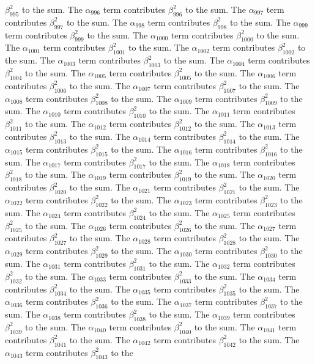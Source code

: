 \begin{lemma}
$\beta_{995}^{2}$ to the sum. The $\alpha_{996}$ term contributes $\beta_{996}^{2}$ to the sum. The $\alpha_{997}$ term contributes $\beta_{997}^{2}$ to the sum. The $\alpha_{998}$ term contributes $\beta_{998}^{2}$ to the sum. The $\alpha_{999}$ term contributes $\beta_{999}^{2}$ to the sum. The $\alpha_{1000}$ term contributes $\beta_{1000}^{2}$ to the sum. The $\alpha_{1001}$ term contributes $\beta_{1001}^{2}$ to the sum. The $\alpha_{1002}$ term contributes $\beta_{1002}^{2}$ to the sum. The $\alpha_{1003}$ term contributes $\beta_{1003}^{2}$ to the sum. The $\alpha_{1004}$ term contributes $\beta_{1004}^{2}$ to the sum. The $\alpha_{1005}$ term contributes $\beta_{1005}^{2}$ to the sum. The $\alpha_{1006}$ term contributes $\beta_{1006}^{2}$ to the sum. The $\alpha_{1007}$ term contributes $\beta_{1007}^{2}$ to the sum. The $\alpha_{1008}$ term contributes $\beta_{1008}^{2}$ to the sum. The $\alpha_{1009}$ term contributes $\beta_{1009}^{2}$ to the sum. The $\alpha_{1010}$ term contributes $\beta_{1010}^{2}$ to the sum. The $\alpha_{1011}$ term contributes $\beta_{1011}^{2}$ to the sum. The $\alpha_{1012}$ term contributes $\beta_{1012}^{2}$ to the sum. The $\alpha_{1013}$ term contributes $\beta_{1013}^{2}$ to the sum. The $\alpha_{1014}$ term contributes $\beta_{1014}^{2}$ to the sum. The $\alpha_{1015}$ term contributes $\beta_{1015}^{2}$ to the sum. The $\alpha_{1016}$ term contributes $\beta_{1016}^{2}$ to the sum. The $\alpha_{1017}$ term contributes $\beta_{1017}^{2}$ to the sum. The $\alpha_{1018}$ term contributes $\beta_{1018}^{2}$ to the sum. The $\alpha_{1019}$ term contributes $\beta_{1019}^{2}$ to the sum. The $\alpha_{1020}$ term contributes $\beta_{1020}^{2}$ to the sum. The $\alpha_{1021}$ term contributes $\beta_{1021}^{2}$ to the sum. The $\alpha_{1022}$ term contributes $\beta_{1022}^{2}$ to the sum. The $\alpha_{1023}$ term contributes $\beta_{1023}^{2}$ to the sum. The $\alpha_{1024}$ term contributes $\beta_{1024}^{2}$ to the sum. The $\alpha_{1025}$ term contributes $\beta_{1025}^{2}$ to the sum. The $\alpha_{1026}$ term contributes $\beta_{1026}^{2}$ to the sum. The $\alpha_{1027}$ term contributes $\beta_{1027}^{2}$ to the sum. The $\alpha_{1028}$ term contributes $\beta_{1028}^{2}$ to the sum. The $\alpha_{1029}$ term contributes $\beta_{1029}^{2}$ to the sum. The $\alpha_{1030}$ term contributes $\beta_{1030}^{2}$ to the sum. The $\alpha_{1031}$ term contributes $\beta_{1031}^{2}$ to the sum. The $\alpha_{1032}$ term contributes $\beta_{1032}^{2}$ to the sum. The $\alpha_{1033}$ term contributes $\beta_{1033}^{2}$ to the sum. The $\alpha_{1034}$ term contributes $\beta_{1034}^{2}$ to the sum. The $\alpha_{1035}$ term contributes $\beta_{1035}^{2}$ to the sum. The $\alpha_{1036}$ term contributes $\beta_{1036}^{2}$ to the sum. The $\alpha_{1037}$ term contributes $\beta_{1037}^{2}$ to the sum. The $\alpha_{1038}$ term contributes $\beta_{1038}^{2}$ to the sum. The $\alpha_{1039}$ term contributes $\beta_{1039}^{2}$ to the sum. The $\alpha_{1040}$ term contributes $\beta_{1040}^{2}$ to the sum. The $\alpha_{1041}$ term contributes $\beta_{1041}^{2}$ to the sum. The $\alpha_{1042}$ term contributes $\beta_{1042}^{2}$ to the sum. The $\alpha_{1043}$ term contributes $\beta_{1043}^{2}$ to the 
\end{lemma}
